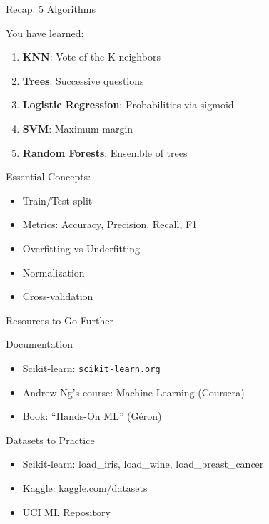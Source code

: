 \documentclass[aspectratio=169]{beamer}
\begin{document}
\begin{frame}{Recap: 5 Algorithms}
\begin{block}{You have learned:}
\begin{enumerate}
    \item \textbf{KNN}: Vote of the K neighbors
    \item \textbf{Trees}: Successive questions
    \item \textbf{Logistic Regression}: Probabilities via sigmoid
    \item \textbf{SVM}: Maximum margin
    \item \textbf{Random Forests}: Ensemble of trees
\end{enumerate}
\end{block}

\begin{block}{Essential Concepts:}
\begin{itemize}
    \item Train/Test split
    \item Metrics: Accuracy, Precision, Recall, F1
    \item Overfitting vs Underfitting
    \item Normalization
    \item Cross-validation
\end{itemize}
\end{block}
\end{frame}



\begin{frame}{Resources to Go Further}
\begin{block}{Documentation}
\begin{itemize}
    \item Scikit-learn: \texttt{scikit-learn.org}
    \item Andrew Ng's course: Machine Learning (Coursera)
    \item Book: ``Hands-On ML'' (Géron)
\end{itemize}
\end{block}

\begin{block}{Datasets to Practice}
\begin{itemize}
    \item Scikit-learn: load\_iris, load\_wine, load\_breast\_cancer
    \item Kaggle: kaggle.com/datasets
    \item UCI ML Repository
\end{itemize}
\end{block}


\end{frame}
\end{document}
